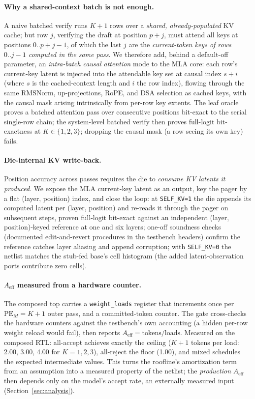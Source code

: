 \documentclass[11pt]{article}
\newcommand{\code}[1]{\texttt{#1}}
\begin{document}
\paragraph{Why a shared-context batch is not enough.} A naive batched verify
runs $K{+}1$ rows over a \emph{shared, already-populated} KV cache; but row
$j$, verifying the draft at position $p{+}j$, must attend all keys at positions
$0..p{+}j{-}1$, of which the last $j$ are the \emph{current-token keys of rows
$0..j{-}1$ computed in the same pass}. We therefore add, behind a default-off
parameter, an \emph{intra-batch causal attention} mode to the MLA core: each
row's current-key latent is injected into the attendable key set at causal
index $s{+}i$ (where $s$ is the cached-context length and $i$ the row index),
flowing through the same RMSNorm, up-projections, RoPE, and DSA selection as
cached keys, with the causal mask arising intrinsically from per-row key
extents. The leaf oracle proves a batched attention pass over consecutive
positions bit-exact to the serial single-row chain; the system-level batched
verify then proves full-logit bit-exactness at $K\in\{1,2,3\}$; dropping the
causal mask (a row seeing its own key) fails.

\paragraph{Die-internal KV write-back.} Position accuracy across passes
requires the die to \emph{consume KV latents it produced}. We expose the MLA
current-key latent as an output, key the pager by a flat (layer, position)
index, and close the loop: at \code{SELF\_KV=1} the die appends its computed
latent per (layer, position) and re-reads it through the pager on subsequent
steps, proven full-logit bit-exact against an independent (layer,
position)-keyed reference at one and six layers; one-off soundness checks
(documented edit-and-revert procedures in the testbench headers) confirm the
reference catches layer aliasing and append corruption; with
\code{SELF\_KV=0} the netlist matches the stub-fed base's cell histogram (the
added latent-observation ports contribute zero cells).

\paragraph{$A_{\mathrm{eff}}$ measured from a hardware counter.} The composed
top carries a \code{weight\_loads} register that increments once per
$\mathrm{PE}_M{=}K{+}1$ outer pass, and a committed-token counter. The gate
cross-checks the hardware counters against the testbench's own accounting
(a hidden per-row weight reload would fail), then reports
$A_{\mathrm{eff}} = \text{tokens}/\text{loads}$. Measured on the composed RTL:
all-accept achieves exactly the ceiling ($K{+}1$ tokens per load: 2.00, 3.00,
4.00 for $K{=}1,2,3$), all-reject the floor (1.00), and mixed schedules the
expected intermediate values. This turns the roofline's amortization term from
an assumption into a measured property of the netlist; the \emph{production}
$A_{\mathrm{eff}}$ then depends only on the model's accept rate, an externally
measured input (Section~\ref{sec:analysis}).
\end{document}
